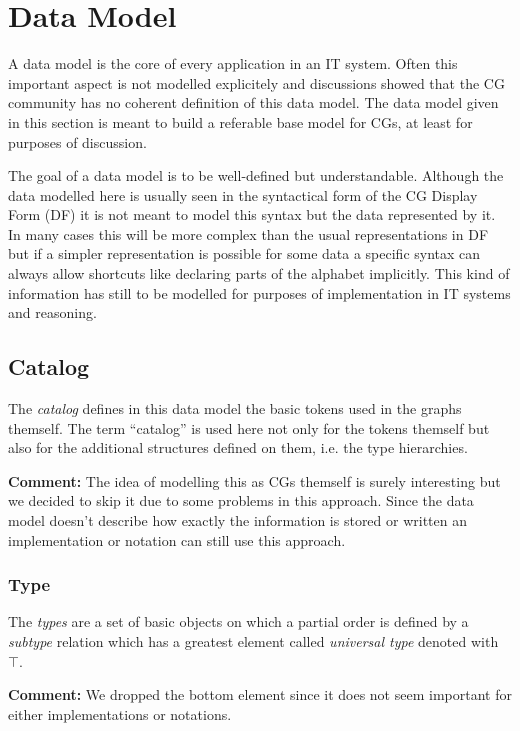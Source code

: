 \documentclass{article}
\newcommand{\defname}{\textit}
\newcommand{\comment}{\textbf{Comment: }}
\begin{document}
\section{Data Model}
\label{sec:dataModel}

A data model is the core of every application in an IT system. Often this
important aspect is not modelled explicitely and discussions showed that the
CG community has no coherent definition of this data model. The data model
given in this section is meant to build a referable base model for CGs, at
least for purposes of discussion.

The goal of a data model is to be well-defined but
understandable. Although the data modelled here is usually seen in the
syntactical form of the CG Display Form (DF) it is not meant to model
this syntax but the data represented by it. In many cases this will be
more complex than the usual representations in DF but if a simpler
representation is possible for some data a specific syntax can always
allow shortcuts like declaring parts of the alphabet implicitly. This
kind of information has still to be modelled for purposes of
implementation in IT systems and reasoning.

\subsection{Catalog}

The \defname{catalog} defines in this data model the basic tokens used
in the graphs themself. The term ``catalog'' is used here not only for
the tokens themself but also for the additional structures defined on
them, i.e. the type hierarchies.

\comment{The idea of modelling this as CGs themself is surely
interesting but we decided to skip it due to some problems in this
approach. Since the data model doesn't describe how exactly the
information is stored or written an implementation or notation can
still use this approach.}

\subsubsection{Type}

The \defname{types} are a set of basic objects on which a partial order is
defined by a \defname{subtype} relation which has a greatest element
called \defname{universal type} denoted with $\top$.

\comment{We dropped the bottom element since it does not seem important
for either implementations or notations.}
\end{document}
